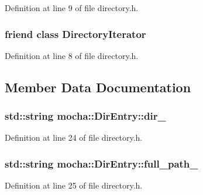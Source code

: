 Definition at line 9 of file directory.h.

\hypertarget{classmocha_1_1_dir_entry_ae63907c37399ddb1ac7a104c3fe64423}{
\subsubsection[{DirectoryIterator}]{\setlength{\rightskip}{0pt plus 5cm}friend class {\bf DirectoryIterator}}}
\label{classmocha_1_1_dir_entry_ae63907c37399ddb1ac7a104c3fe64423}


Definition at line 8 of file directory.h.



\subsection{Member Data Documentation}
\hypertarget{classmocha_1_1_dir_entry_aa7c3d579d46d694ac584f3f197c43d8d}{
\subsubsection[{dir\_\-}]{\setlength{\rightskip}{0pt plus 5cm}std::string {\bf mocha::DirEntry::dir\_\-}}}
\label{classmocha_1_1_dir_entry_aa7c3d579d46d694ac584f3f197c43d8d}


Definition at line 24 of file directory.h.

\hypertarget{classmocha_1_1_dir_entry_ad257721184bc483c22fb639f3e98e6ad}{
\subsubsection[{full\_\-path\_\-}]{\setlength{\rightskip}{0pt plus 5cm}std::string {\bf mocha::DirEntry::full\_\-path\_\-}}}
\label{classmocha_1_1_dir_entry_ad257721184bc483c22fb639f3e98e6ad}


Definition at line 25 of file directory.h.

